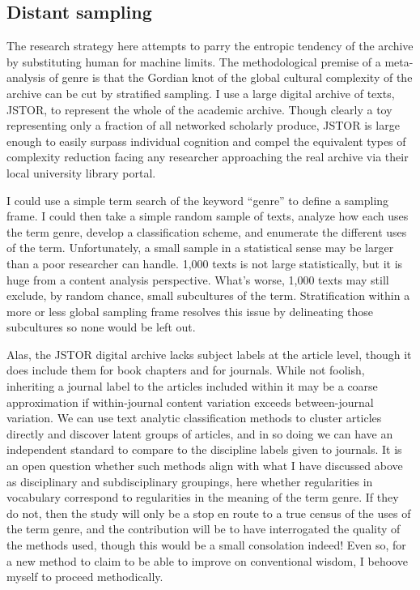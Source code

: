 \documentclass[]{book}
\theoremstyle{definition}
\theoremstyle{definition}
\theoremstyle{definition}
\theoremstyle{remark}
\begin{document}
\hypertarget{distant-sampling}{%
\subsection{Distant sampling}\label{distant-sampling}}

The research strategy here attempts to parry the entropic tendency of
the archive by substituting human for machine limits. The methodological
premise of a meta-analysis of genre is that the Gordian knot of the
global cultural complexity of the archive can be cut by stratified
sampling. I use a large digital archive of texts, JSTOR, to represent
the whole of the academic archive. Though clearly a toy representing
only a fraction of all networked scholarly produce, JSTOR is large
enough to easily surpass individual cognition and compel the equivalent
types of complexity reduction facing any researcher approaching the real
archive via their local university library portal.

I could use a simple term search of the keyword ``genre'' to define a
sampling frame. I could then take a simple random sample of texts,
analyze how each uses the term genre, develop a classification scheme,
and enumerate the different uses of the term. Unfortunately, a small
sample in a statistical sense may be larger than a poor researcher can
handle. 1,000 texts is not large statistically, but it is huge from a
content analysis perspective. What's worse, 1,000 texts may still
exclude, by random chance, small subcultures of the term. Stratification
within a more or less global sampling frame resolves this issue by
delineating those subcultures so none would be left out.

Alas, the JSTOR digital archive lacks subject labels at the article
level, though it does include them for book chapters and for journals.
While not foolish, inheriting a journal label to the articles included
within it may be a coarse approximation if within-journal content
variation exceeds between-journal variation. We can use text analytic
classification methods to cluster articles directly and discover latent
groups of articles, and in so doing we can have an independent standard
to compare to the discipline labels given to journals. It is an open
question whether such methods align with what I have discussed above as
disciplinary and subdisciplinary groupings, here whether regularities in
vocabulary correspond to regularities in the meaning of the term genre.
If they do not, then the study will only be a stop en route to a true
census of the uses of the term genre, and the contribution will be to
have interrogated the quality of the methods used, though this would be
a small consolation indeed! Even so, for a new method to claim to be
able to improve on conventional wisdom, I behoove myself to proceed
methodically.
\end{document}
